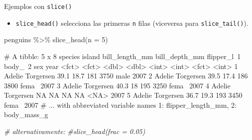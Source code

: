 \documentclass[
  ignorenonframetext,
  aspectratio=169]{beamer}
\newenvironment{Shaded}{\begin{snugshade}}{\end{snugshade}}
\newcommand{\AttributeTok}[1]{\textcolor[rgb]{0.77,0.63,0.00}{#1}}
\newcommand{\CommentTok}[1]{\textcolor[rgb]{0.56,0.35,0.01}{\textit{#1}}}
\newcommand{\DecValTok}[1]{\textcolor[rgb]{0.00,0.00,0.81}{#1}}
\newcommand{\FunctionTok}[1]{\textcolor[rgb]{0.00,0.00,0.00}{#1}}
\newcommand{\NormalTok}[1]{#1}
\newcommand{\SpecialCharTok}[1]{\textcolor[rgb]{0.00,0.00,0.00}{#1}}
\providecommand{\tightlist}{%
  \setlength{\itemsep}{0pt}\setlength{\parskip}{0pt}}
\let\oldverbatim\verbatim
\let\endoldverbatim\endverbatim
\renewenvironment{verbatim}{\tiny\oldverbatim}{\endoldverbatim}
\begin{document}
\begin{frame}[fragile]{Ejemplos con \texttt{slice()}}
\protect\hypertarget{ejemplos-con-slice-1}{}
\begin{itemize}
\tightlist
\item
  \texttt{slice\_head()} selecciona las primeras \texttt{n} filas
  (viceversa para \texttt{slice\_tail()}).
\end{itemize}

\begin{Shaded}
\begin{Highlighting}[]
\NormalTok{penguins }\SpecialCharTok{\%\textgreater{}\%} 
  \FunctionTok{slice\_head}\NormalTok{(}\AttributeTok{n =} \DecValTok{5}\NormalTok{) }
\end{Highlighting}
\end{Shaded}

\begin{verbatim}
# A tibble: 5 x 8
  species island    bill_length_mm bill_depth_mm flipper_l~1 body_~2 sex    year
  <fct>   <fct>              <dbl>         <dbl>       <int>   <int> <fct> <int>
1 Adelie  Torgersen           39.1          18.7         181    3750 male   2007
2 Adelie  Torgersen           39.5          17.4         186    3800 fema~  2007
3 Adelie  Torgersen           40.3          18           195    3250 fema~  2007
4 Adelie  Torgersen           NA            NA            NA      NA <NA>   2007
5 Adelie  Torgersen           36.7          19.3         193    3450 fema~  2007
# ... with abbreviated variable names 1: flipper_length_mm, 2: body_mass_g
\end{verbatim}

\begin{Shaded}
\begin{Highlighting}[]
\CommentTok{\# alternativamente: }
\CommentTok{\#slice\_head(frac = 0.05)}
\end{Highlighting}
\end{Shaded}
\end{frame}
\end{document}
